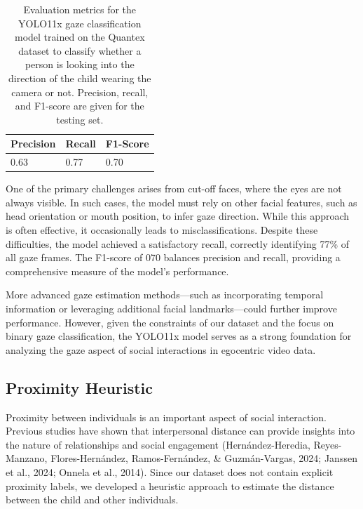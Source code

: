 \documentclass[
  man,floatsintext]{apa6}
\begin{document}
\begin{table}[tbp]

\begin{center}
\begin{threeparttable}

\caption{\label{tab:gaze-metrics}Evaluation metrics for the YOLO11x gaze classification model trained on the Quantex dataset to classify whether a person is looking into the direction of the child wearing the camera or not. Precision, recall, and F1-score are given for the testing set.}

\begin{tabular}{lll}
\toprule
Precision & \multicolumn{1}{c}{Recall} & \multicolumn{1}{c}{F1-Score}\\
\midrule
0.63 & 0.77 & 0.70\\
\bottomrule
\end{tabular}

\end{threeparttable}
\end{center}

\end{table}

One of the primary challenges arises from cut-off faces, where the eyes are not always visible. In such cases, the model must rely on other facial features, such as head orientation or mouth position, to infer gaze direction. While this approach is often effective, it occasionally leads to misclassifications. Despite these difficulties, the model achieved a satisfactory recall, correctly identifying 77\% of all gaze frames. The F1-score of 070 balances precision and recall, providing a comprehensive measure of the model's performance.

More advanced gaze estimation methods---such as incorporating temporal information or leveraging additional facial landmarks---could further improve performance. However, given the constraints of our dataset and the focus on binary gaze classification, the YOLO11x model serves as a strong foundation for analyzing the gaze aspect of social interactions in egocentric video data.

\subsection{Proximity Heuristic}\label{proximity-heuristic}

Proximity between individuals is an important aspect of social interaction. Previous studies have shown that interpersonal distance can provide insights into the nature of relationships and social engagement (Hernández-Heredia, Reyes-Manzano, Flores-Hernández, Ramos-Fernández, \& Guzmán-Vargas, 2024; Janssen et al., 2024; Onnela et al., 2014). Since our dataset does not contain explicit proximity labels, we developed a heuristic approach to estimate the distance between the child and other individuals.
\end{document}
